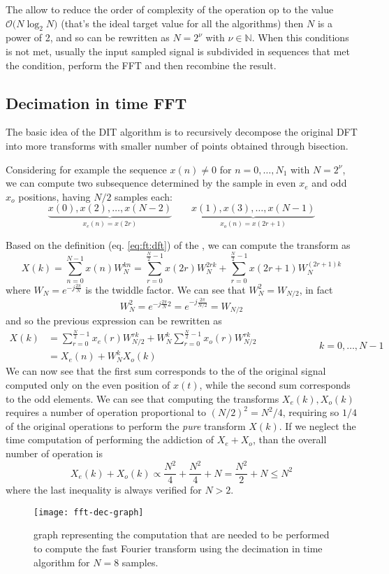 	The \fft allow to reduce the order of complexity of the operation op to the value $\mathcal O \big(N \log_2 N\big)$ (that's the ideal target value for all the algorithms) then $N$ is a power of 2, and so can be rewritten as $N = 2^\nu$ with $\nu \in \mathds N$. When this conditions is not met, usually the input sampled signal is subdivided in sequences that met the condition, perform the FFT and then recombine the result.
	
\subsection{Decimation in time FFT}
	The basic idea of the  DIT \fft algorithm is to recursively decompose the original DFT into more transforms with smaller number of points obtained through bisection.
	
	Considering for example the sequence $x(n) \neq 0$ for $n=0,\dots, N_1$ with $N = 2^\nu$, we can compute two subsequence determined by the sample in even $x_e$ and odd $x_o$ positions, having $N/2$ samples each:
	\[ \underbrace{x(0),x(2),\dots,x(N-2)}_{x_e(n) = x(2r)} \qquad \underbrace{x(1), x(3),\dots, x(N-1)}_{x_o(n) = x(2r + 1)}  \]
	
	Based on the definition (eq. \ref{eq:ft:dft}) of the \dft, we can compute the transform as
	\[ X(k) = \sum_{n=0}^{N-1} x(n) W_N^{kn} = \sum_{r=0}^{\frac N 2 - 1 } x(2r) W_N^{2rk} + \sum_{r=0}^{\frac N 2 - 1} x(2r+1) W_N^{(2r+1)k} \]
	where $W_N = e^{-j\frac{2\pi}{N}}$ is the twiddle factor. We can see that $W_N^2 = W_{N/2}$, in fact
	\[ W_N^2 = e^{-j\frac{2\pi}{N} 2 } = e^{-j\frac{2\pi}{N/2} } = W_{N/2} \]
	and so the previous expression can be rewritten as
	\[ \begin{aligned}
		X(k) & =  \sum_{r=0}^{\frac N 2 - 1 } x_e(r) W_{N/2}^{rk} + W_{N}^k  \sum_{r=0}^{\frac N 2 - 1 } x_o(r) W_{N/2}^{rk} \\ & = X_e(n) + W_N^k X_o(k)  
	\end{aligned} \qquad \qquad \qquad k = 0,\dots,N-1\]
	We can now see that the first sum corresponds to the \dft of the original signal computed only on the even position of $x(t)$, while the second sum corresponds to the odd elements. We can see that computing the transforms $X_e(k),X_o(k)$ requires a number of operation proportional to $(N/2)^2 = N^2/4$, requiring so $1/4$ of the original operations to perform the \textit{pure} transform $X(k)$. If we neglect the time computation of performing the addiction of $X_e+X_o$, than the overall number of operation is
	\[ X_e(k) + X_o(k) \propto \frac{N^2}{4} + \frac{N^2}{4} + N = \frac{N^2}{2} + N \leq N^2 \]
	where the last inequality is always verified for $N>2$.
	\begin{SCfigure}[2][bht]
		\centering \texttt{[image: fft-dec-graph]}
		\caption{graph representing the computation that are needed to be performed to compute the fast Fourier transform using the decimation in time algorithm for $N=8$ samples.}
	\end{SCfigure}
	
